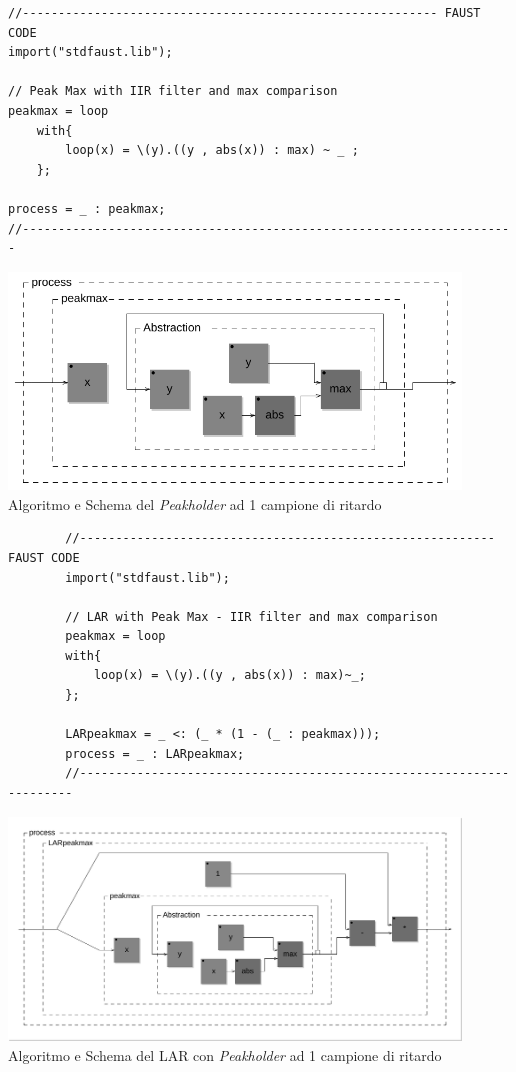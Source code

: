 \vspace{0.5cm}
\begin{lstlisting}
//---------------------------------------------------------- FAUST CODE
import("stdfaust.lib");

// Peak Max with IIR filter and max comparison
peakmax = loop
    with{
        loop(x) = \(y).((y , abs(x)) : max) ~ _ ;
    };
    
process = _ : peakmax;
//---------------------------------------------------------------------
\end{lstlisting}
\begin{center}
    \includegraphics[width=12cm]{figures/PeakholderIIR.pdf} \\
    {Algoritmo e Schema del \textit{Peakholder} ad 1 campione di ritardo} \\ 
    \end{center}
    \begin{lstlisting}
        //---------------------------------------------------------- FAUST CODE
        import("stdfaust.lib");
        
        // LAR with Peak Max - IIR filter and max comparison
        peakmax = loop
        with{
            loop(x) = \(y).((y , abs(x)) : max)~_;
        };
        
        LARpeakmax = _ <: (_ * (1 - (_ : peakmax)));
        process = _ : LARpeakmax;
        //---------------------------------------------------------------------
    \end{lstlisting}
\begin{center}
    \includegraphics[width=12cm]{figures/LARpeakmax.pdf} \\
    {Algoritmo e Schema del LAR con \textit{Peakholder} ad 1 campione di ritardo} \\ 
\end{center}
\vspace{0.5cm}

